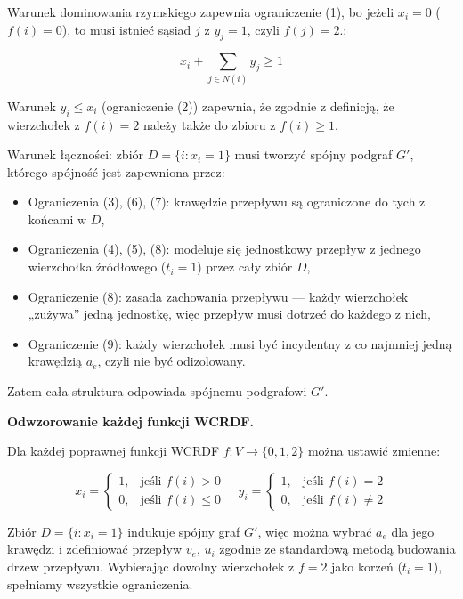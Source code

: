 Warunek dominowania rzymskiego zapewnia ograniczenie (1), bo jeżeli \( x_i = 0 \) (\( f(i) = 0 \)), to musi istnieć sąsiad \( j \) z \( y_j = 1 \), czyli \( f(j) = 2 \).:

\[
x_i + \sum_{j \in N(i)} y_j \geq 1
\]

Warunek \( y_i \leq x_i \) (ograniczenie (2)) zapewnia, że zgodnie z definicją, że wierzchołek z \( f(i) = 2 \) należy także do zbioru z \( f(i) \geq 1 \).

Warunek łączności: zbiór \( D = \{i : x_i = 1\} \) musi tworzyć spójny podgraf \( G' \), którego spójność jest zapewniona przez:

\begin{itemize}
    \item Ograniczenia (3), (6), (7): krawędzie przepływu są ograniczone do tych z końcami w \( D \),
    \item Ograniczenia (4), (5), (8): modeluje się jednostkowy przepływ z jednego wierzchołka źródłowego ($t_i = 1$) przez cały zbiór \( D \),
    \item Ograniczenie (8): zasada zachowania przepływu — każdy wierzchołek „zużywa” jedną jednostkę, więc przepływ musi dotrzeć do każdego z nich,
    \item Ograniczenie (9): każdy wierzchołek musi być incydentny z co najmniej jedną krawędzią $a_e$, czyli nie być odizolowany.
\end{itemize}

Zatem cała struktura odpowiada spójnemu podgrafowi \( G' \).

\textbf{Odwzorowanie każdej funkcji WCRDF.}

Dla każdej poprawnej funkcji WCRDF \( f : V \to \{0,1,2\} \) można ustawić zmienne:

\[
x_i =
\begin{cases}
1, & \text{jeśli } f(i) > 0 \\
0, & \text{jeśli } f(i) \leq 0
\end{cases}
\quad
y_i =
\begin{cases}
1, & \text{jeśli } f(i) = 2 \\
0, & \text{jeśli } f(i) \ne 2 
\end{cases}
\]

Zbiór \( D = \{i : x_i = 1\} \) indukuje spójny graf \( G' \), więc można wybrać \( a_e \) dla jego krawędzi i zdefiniować przepływ \( v_e \), \( u_i \) zgodnie ze standardową metodą budowania drzew przepływu. Wybierając dowolny wierzchołek z \( f = 2 \) jako korzeń ($t_i = 1$), spełniamy wszystkie ograniczenia.

